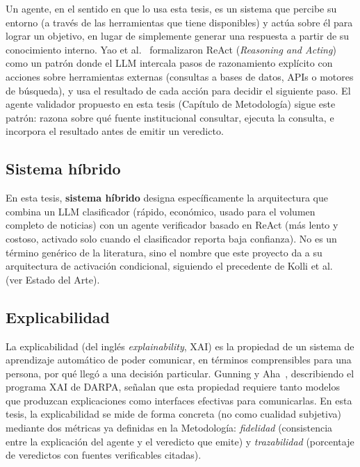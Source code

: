 Un agente, en el sentido en que lo usa esta tesis, es un sistema que percibe su entorno (a través de las herramientas que tiene disponibles) y actúa sobre él para lograr un objetivo, en lugar de simplemente generar una respuesta a partir de su conocimiento interno. Yao et al.~\cite{Yao2023} formalizaron ReAct (\textit{Reasoning and Acting}) como un patrón donde el LLM intercala pasos de razonamiento explícito con acciones sobre herramientas externas (consultas a bases de datos, APIs o motores de búsqueda), y usa el resultado de cada acción para decidir el siguiente paso. El agente validador propuesto en esta tesis (Capítulo de Metodología) sigue este patrón: razona sobre qué fuente institucional consultar, ejecuta la consulta, e incorpora el resultado antes de emitir un veredicto.

\subsection{Sistema híbrido}

En esta tesis, \textbf{sistema híbrido} designa específicamente la arquitectura que combina un LLM clasificador (rápido, económico, usado para el volumen completo de noticias) con un agente verificador basado en ReAct (más lento y costoso, activado solo cuando el clasificador reporta baja confianza). No es un término genérico de la literatura, sino el nombre que este proyecto da a su arquitectura de activación condicional, siguiendo el precedente de Kolli et al.~\cite{Kolli2025} (ver Estado del Arte).

\subsection{Explicabilidad}

La explicabilidad (del inglés \textit{explainability}, XAI) es la propiedad de un sistema de aprendizaje automático de poder comunicar, en términos comprensibles para una persona, por qué llegó a una decisión particular. Gunning y Aha~\cite{GunningAha2019}, describiendo el programa XAI de DARPA, señalan que esta propiedad requiere tanto modelos que produzcan explicaciones como interfaces efectivas para comunicarlas. En esta tesis, la explicabilidad se mide de forma concreta (no como cualidad subjetiva) mediante dos métricas ya definidas en la Metodología: \textit{fidelidad} (consistencia entre la explicación del agente y el veredicto que emite) y \textit{trazabilidad} (porcentaje de veredictos con fuentes verificables citadas).

